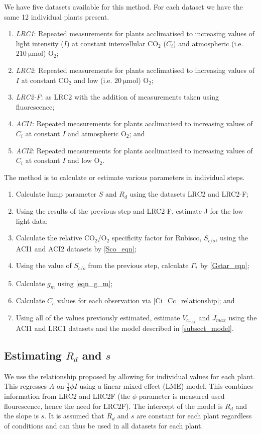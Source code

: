 \documentclass[11pt]{article} %
\begin{document}
We have five datasets available for this method. For each dataset we have the same 12 individual plants present.
\begin{enumerate} \label{datasets}
 \item \emph{LRC1}: Repeated measurements for plants acclimatised to increasing values of light intensity ($I$) at constant intercellular CO$_2$ ($C_i$) and atmospheric (i.e. $\SI{210}{\micro \mol}$) O$_2$;
 \item \emph{LRC2}: Repeated measurements for plants acclimatised to increasing values of $I$ at constant CO$_2$ and low (i.e. $\SI{20}{\micro \mol}$) O$_2$;
 \item \emph{LRC2-F}: as LRC2 with the addition of measurements taken using fluorescence;
 \item \emph{ACI1}: Repeated measurements for plants acclimatised to increasing values of $C_i$ at constant $I$ and atmospheric O$_2$; and
 \item \emph{ACI2}: Repeated measurements for plants acclimatised to increasing values of $C_i$ at constant $I$ and low O$_2$.
\end{enumerate}
The method is to calculate or estimate various parameters in individual steps.
\begin{enumerate}
 \item Calculate lump parameter $S$ and $R_d$ using the datasets LRC2 and LRC2-F;
 \item Using the results of the previous step and LRC2-F, estimate J for the low light data;
 \item Calculate the relative CO$_2$/O$_2$ specificity factor for Rubisco, $S_{c/o}$, using the ACI1 and ACI2 datasets by \eqref{Sco_eqn};
 \item Using the value of $S_{c/o}$ from the previous step, calculate $\Gamma_*$ by \eqref{Gstar_eqn};
 \item Calculate $g_m$ using \eqref{eqn_g_m};
 \item Calculate $C_c$ values for each observation via \eqref{Ci_Cc_relationship}; and
 \item Using all of the values previously estimated, estimate $V_{c_{max}}$ and $J_{max}$ using the ACI1 and LRC1 datasets and the model described in \ref{subsect_model}.
\end{enumerate}

\subsection{Estimating $R_d$ and $s$}
We use the relationship proposed by \citet{YinUsingcombinedmeasurements2009} allowing for individual values for each plant. This regresses $A$ on $\frac{1}{4}\phi I$ using a linear mixed effect (LME) model. This combines information from LRC2 and LRC2F (the $\phi$ parameter is measured used flourescence, hence the need for LRC2F). The intercept of the model is $R_d$ and the slope is $s$. It is assumed that $R_d$ and $s$ are constant for each plant regardless of conditions and can thus be used in all datasets for each plant.
\end{document}
